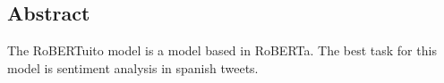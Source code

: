 \begin{center}
    \begin{minipage}{0.8\linewidth}
        \begin{center}
            \subsection*{Abstract}
        \end{center}
        The RoBERTuito model is a model based in RoBERTa. The best task for this model is sentiment analysis in spanish tweets.
    \end{minipage}
\end{center}
